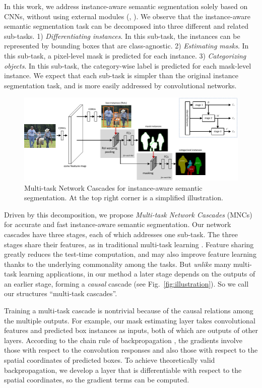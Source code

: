 \documentclass[10pt,twocolumn,letterpaper]{article}
\begin{document}
In this work, we address instance-aware semantic segmentation solely based on CNNs, without using external modules (\eg, \cite{Arbelaez2014}).
We observe that the instance-aware semantic segmentation task can be decomposed into three different and related sub-tasks. 1) \emph{Differentiating instances}. In this sub-task, the instances can be represented by bounding boxes that are class-agnostic.
2) \emph{Estimating masks}. In this sub-task, a pixel-level mask is predicted for each instance. 3) \emph{Categorizing objects}. In this sub-task, the category-wise label is predicted for each mask-level instance. We expect that each sub-task is simpler than the original instance segmentation task, and is more easily addressed by convolutional networks.

\begin{figure}[t]
\centering
\includegraphics[width=0.85\linewidth]{figure/overview}
\caption{Multi-task Network Cascades for instance-aware semantic segmentation. At the top right corner is a simplified illustration.}
\label{fig:overview}
\end{figure}

Driven by this decomposition, we propose \emph{Multi-task Network Cascades} (MNCs) for accurate and fast instance-aware semantic segmentation. Our network cascades have three stages, each of which addresses one sub-task.
The three stages share their features, as in traditional multi-task learning \cite{Caruana1997}. Feature sharing greatly reduces the test-time computation, and may also improve feature learning thanks to the underlying commonality among the tasks. But \emph{unlike} many multi-task learning applications, in our method a later stage depends on the outputs of an earlier stage, forming a \emph{causal} cascade (see Fig.~\ref{fig:illustration}). So we call our structures ``multi-task cascades''.

Training a multi-task cascade is nontrivial because of the causal relations among the multiple outputs. For example, our mask estimating layer takes convolutional features and predicted box instances as inputs, both of which are outputs of other layers. According to the chain rule of backpropagation \cite{LeCun1989}, the gradients involve those with respect to the convolution responses and also those with respect to the spatial coordinates of predicted boxes. To achieve theoretically valid backpropagation, we develop a layer that is differentiable with respect to the spatial coordinates, so the gradient terms can be computed.
\end{document}

